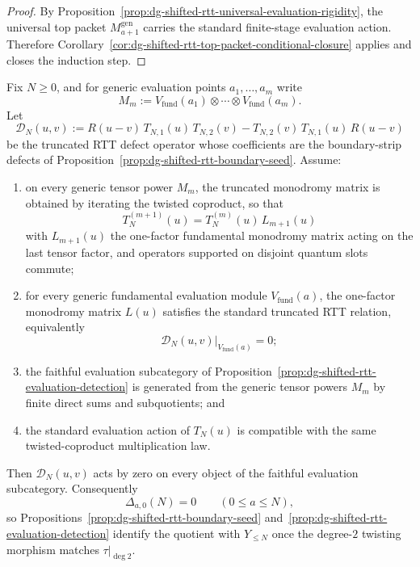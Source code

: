 \begin{proof}
By
Proposition~\ref{prop:dg-shifted-rtt-universal-evaluation-rigidity},
the universal top packet $M_{a+1}^{\mathrm{gen}}$ carries the standard
finite-stage evaluation action.  Therefore
Corollary~\ref{cor:dg-shifted-rtt-top-packet-conditional-closure}
applies and closes the induction step.
\end{proof}

\begin{proposition}
\label{prop:dg-shifted-rtt-fundamental-propagation}
Fix $N \ge 0$, and for generic evaluation points
$a_1,\dots,a_m$ write
\[
M_m:=V_{\mathrm{fund}}(a_1)\otimes\cdots\otimes V_{\mathrm{fund}}(a_m).
\]
Let
\[
\mathcal{D}_N(u,v):=
R(u-v)\,T_{N,1}(u)\,T_{N,2}(v)
-T_{N,2}(v)\,T_{N,1}(u)\,R(u-v)
\]
be the truncated RTT defect operator whose coefficients are the
boundary-strip defects of
Proposition~\ref{prop:dg-shifted-rtt-boundary-seed}.  Assume:
\begin{enumerate}[label=\textup{(\roman*)}]
\item on every generic tensor power $M_m$, the truncated monodromy
  matrix is obtained by iterating the twisted coproduct, so that
  \[
  T_N^{(m+1)}(u)=T_N^{(m)}(u)\,L_{m+1}(u)
  \]
  with $L_{m+1}(u)$ the one-factor fundamental monodromy matrix acting
  on the last tensor factor, and operators supported on disjoint
  quantum slots commute;
\item for every generic fundamental evaluation module
  $V_{\mathrm{fund}}(a)$, the one-factor monodromy matrix $L(u)$
  satisfies the standard truncated RTT relation, equivalently
  \[
  \mathcal{D}_N(u,v)\big|_{V_{\mathrm{fund}}(a)}=0;
  \]
\item the faithful evaluation subcategory of
  Proposition~\ref{prop:dg-shifted-rtt-evaluation-detection} is
  generated from the generic tensor powers $M_m$ by finite direct sums
  and subquotients; and
\item the standard evaluation action of $T_N(u)$ is compatible with the
  same twisted-coproduct multiplication law.
\end{enumerate}
Then $\mathcal{D}_N(u,v)$ acts by zero on every object of the faithful
evaluation subcategory.  Consequently
\[
\Delta_{a,0}(N)=0
\qquad (0\le a\le N),
\]
so
Propositions~\ref{prop:dg-shifted-rtt-boundary-seed}
and~\ref{prop:dg-shifted-rtt-evaluation-detection}
identify the quotient with $Y_{\le N}$ once the degree-$2$ twisting
morphism matches $\tau|_{\deg 2}$.
\end{proposition}

